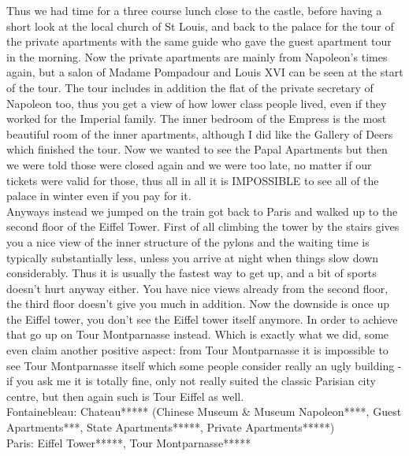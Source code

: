 Thus we had time for a three course lunch close to the castle, before having a short look at the local church of St Louis, and back to the palace for the tour of the private apartments with the same guide who gave the guest apartment tour in the morning. Now the private apartments are mainly from Napoleon's times again, but a salon of Madame Pompadour and Louis XVI can be seen at the start of the tour. The tour includes in addition the flat of the private secretary of Napoleon too, thus you get a view of how lower class people lived, even if they worked for the Imperial family. The inner bedroom of the Empress is the most beautiful room of the inner apartments, although I did like the Gallery of Deers which finished the tour. Now we wanted to see the Papal Apartments but then we were told those were closed again and we were too late, no matter if our tickets were valid for those, thus all in all it is IMPOSSIBLE to see all of the palace in winter even if you pay for it.\\
Anyways instead we jumped on the train got back to Paris and walked up to the second floor of the Eiffel Tower. First of all climbing the tower by the stairs gives you a nice view of the inner structure of the pylons and the waiting time is typically substantially less, unless you arrive at night when things slow down considerably. Thus it is usually the fastest way to get up, and a bit of sports doesn't hurt anyway either. You have nice views already from the second floor, the third floor doesn't give you much in addition. Now the downside is once up the Eiffel tower, you don't see the Eiffel tower itself anymore. In order to achieve that go up on Tour Montparnasse instead. Which is exactly what we did, some even claim another positive aspect: from Tour Montparnasse it is impossible to see Tour Montparnasse itself which some people consider really an ugly building - if you ask me it is totally fine, only not really suited the classic Parisian city centre, but then again such is Tour Eiffel as well. \\

Fontainebleau: Chateau***** (Chinese Museum \& Museum Napoleon****, Guest Apartments***, State Apartments*****, Private Apartments*****)\\
Paris: Eiffel Tower*****, Tour Montparnasse*****\\

